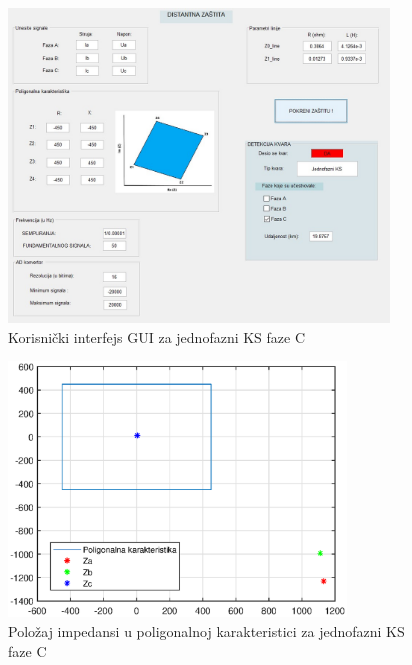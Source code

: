 \begin{figure}[H]
  \centering
  \includegraphics[width=0.9\textwidth]{Rezultati1/gui_1F_C_G.jpg}
  \caption{Korisnički interfejs GUI za jednofazni KS faze C}
  \label{fig:65}
\end{figure}


\begin{figure}[H]
  \centering
  \includegraphics[width=0.8\textwidth]{Rezultati1/karakteristika_1F_C_G.eps}
  \caption{Položaj impedansi u poligonalnoj karakteristici za jednofazni KS faze C }
  \label{fig:66}
\end{figure}

